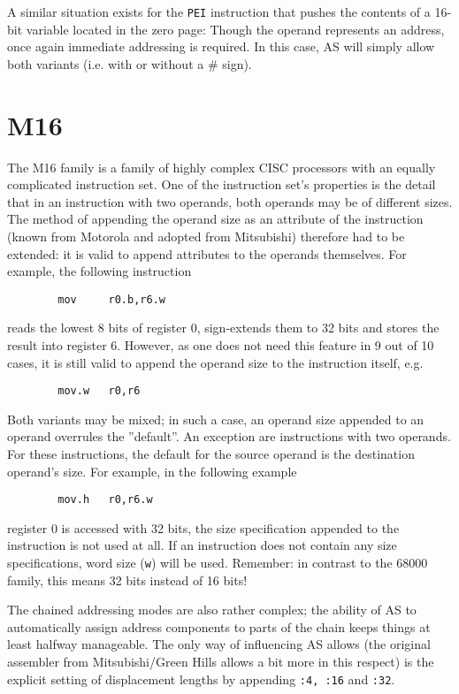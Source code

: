 \documentclass[12pt,twoside]{report}
\newcommand{\tty}[1]{{\tt #1}}
\begin{document}
A similar situation exists for the \tty{PEI} instruction that pushes the
contents of a 16-bit variable located in the zero page: Though the operand
represents an address, once again immediate addressing is required.  In
this case, AS will simply allow both variants (i.e. with or without a \#
sign).


\section{M16}

The M16 family is a family of highly complex CISC processors with an
equally complicated instruction set.  One of the instruction set's
properties is the detail that in an instruction with two operands,
both operands may be of different sizes.  The method of appending the
operand size as an attribute of the instruction (known from Motorola
and adopted from Mitsubishi) therefore had to be extended: it is
valid to append attributes to the operands themselves.  For example,
the following instruction
\begin{verbatim}
        mov     r0.b,r6.w
\end{verbatim}
reads the lowest 8 bits of register 0, sign-extends them to 32 bits
and stores the result into register 6.  However, as one does not need
this feature in 9 out of 10 cases, it is still valid to append the
operand size to the instruction itself, e.g.
\begin{verbatim}
        mov.w   r0,r6
\end{verbatim}
Both variants may be mixed; in such a case, an operand size appended
to an operand overrules the ''default''.  An exception are instructions
with two operands.  For these instructions, the default for the
source operand is the destination operand's size.  For example, in
the following example
\begin{verbatim}
        mov.h   r0,r6.w
\end{verbatim}
register 0 is accessed with 32 bits, the size specification appended
to the instruction is not used at all.  If an instruction does not
contain any size specifications, word size (\tty{w}) will be used.
Remember: in contrast to the 68000 family, this means 32 bits instead
of 16 bits!

The chained addressing modes are also rather complex; the ability of
AS to automatically assign address components to parts of the chain
keeps things at least halfway manageable.  The only way of influencing
AS allows (the original assembler from Mitsubishi/Green Hills allows
a bit more in this respect) is the explicit setting of displacement
lengths by appending \tty{:4, :16} and \tty{:32}.
\end{document}
